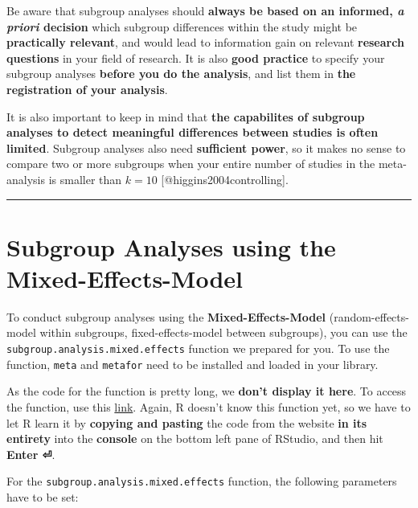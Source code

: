 \documentclass[]{book}
\theoremstyle{definition}
\theoremstyle{definition}
\theoremstyle{definition}
\theoremstyle{remark}
\begin{document}
\begin{rmdachtung}
Be aware that subgroup analyses should \textbf{always be based on an
informed, \emph{a priori} decision} which subgroup differences within
the study might be \textbf{practically relevant}, and would lead to
information gain on relevant \textbf{research questions} in your field
of research. It is also \textbf{good practice} to specify your subgroup
analyses \textbf{before you do the analysis}, and list them in
\textbf{the registration of your analysis}.

It is also important to keep in mind that \textbf{the capabilites of
subgroup analyses to detect meaningful differences between studies is
often limited}. Subgroup analyses also need \textbf{sufficient power},
so it makes no sense to compare two or more subgroups when your entire
number of studies in the meta-analysis is smaller than \(k=10\)
{[}@higgins2004controlling{]}.
\end{rmdachtung}

\begin{center}\rule{0.5\linewidth}{\linethickness}\end{center}

\section{Subgroup Analyses using the Mixed-Effects-Model}\label{mixed}

To conduct subgroup analyses using the \textbf{Mixed-Effects-Model}
(random-effects-model within subgroups, fixed-effects-model between
subgroups), you can use the \texttt{subgroup.analysis.mixed.effects}
function we prepared for you. To use the function, \texttt{meta} and
\texttt{metafor} need to be installed and loaded in your library.

As the code for the function is pretty long, we \textbf{don't display it
here}. To access the function, use this
\href{https://github.com/MathiasHarrer/Doing-Meta-Analysis-in-R/blob/master/subgroup_analyses_mixed_effects_function.R}{link}.
Again, R doesn't know this function yet, so we have to let R learn it by
\textbf{copying and pasting} the code from the website \textbf{in its
entirety} into the \textbf{console} on the bottom left pane of RStudio,
and then hit \textbf{Enter ⏎}.

For the \texttt{subgroup.analysis.mixed.effects} function, the following
parameters have to be set:
\end{document}
